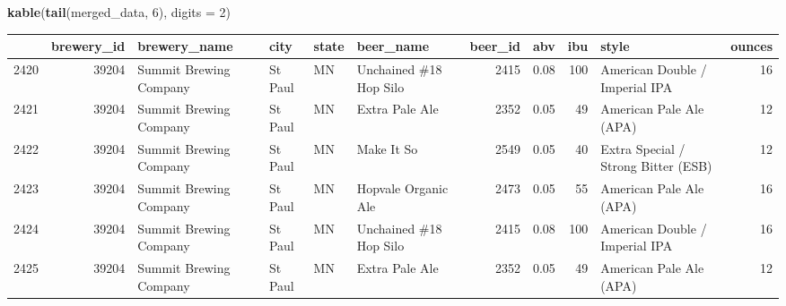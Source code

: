 \documentclass[]{article}
\newenvironment{Shaded}{\begin{snugshade}}{\end{snugshade}}
\newcommand{\KeywordTok}[1]{\textcolor[rgb]{0.13,0.29,0.53}{\textbf{#1}}}
\newcommand{\DataTypeTok}[1]{\textcolor[rgb]{0.13,0.29,0.53}{#1}}
\newcommand{\DecValTok}[1]{\textcolor[rgb]{0.00,0.00,0.81}{#1}}
\newcommand{\NormalTok}[1]{#1}
\begin{document}
\begin{Shaded}
\begin{Highlighting}[]
\KeywordTok{kable}\NormalTok{(}\KeywordTok{tail}\NormalTok{(merged_data, }\DecValTok{6}\NormalTok{), }\DataTypeTok{digits =} \DecValTok{2}\NormalTok{)}
\end{Highlighting}
\end{Shaded}

\begin{longtable}[]{@{}lrllllrrrlr@{}}
\toprule
& brewery\_id & brewery\_name & city & state & beer\_name & beer\_id &
abv & ibu & style & ounces\tabularnewline
\midrule
\endhead
2420 & 39204 & Summit Brewing Company & St Paul & MN & Unchained \#18
Hop Silo & 2415 & 0.08 & 100 & American Double / Imperial IPA &
16\tabularnewline
2421 & 39204 & Summit Brewing Company & St Paul & MN & Extra Pale Ale &
2352 & 0.05 & 49 & American Pale Ale (APA) & 12\tabularnewline
2422 & 39204 & Summit Brewing Company & St Paul & MN & Make It So & 2549
& 0.05 & 40 & Extra Special / Strong Bitter (ESB) & 12\tabularnewline
2423 & 39204 & Summit Brewing Company & St Paul & MN & Hopvale Organic
Ale & 2473 & 0.05 & 55 & American Pale Ale (APA) & 16\tabularnewline
2424 & 39204 & Summit Brewing Company & St Paul & MN & Unchained \#18
Hop Silo & 2415 & 0.08 & 100 & American Double / Imperial IPA &
16\tabularnewline
2425 & 39204 & Summit Brewing Company & St Paul & MN & Extra Pale Ale &
2352 & 0.05 & 49 & American Pale Ale (APA) & 12\tabularnewline
\bottomrule
\end{longtable}
\end{document}
